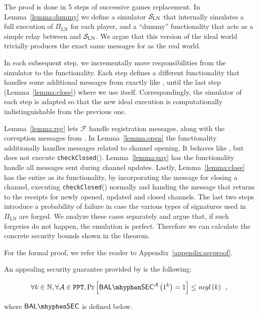   \begin{proofsketch}
    The proof is done in 5 steps of successive games replacement. In
    Lemma~\ref{lemma:dummy} we define a simulator $\mathcal{S}_{\mathrm{LN}}$
    that internally simulates a full execution of $\Pi_{\mathrm{LN}}$ for each
    player, and a ``dummy'' functionality that acts as a simple relay between
    \environment{} and $\mathcal{S}_{\mathrm{LN}}$. We argue that this version of
    the ideal world trivially produces the exact same messages for
    \environment{} as the real world.

    In each subsequent step, we incrementally move responsibilities from the
    simulator to the functionality. Each step defines a different functionality
    that handles some additional messages from \environment{} exactly like
    \fpaynet, until the last step (Lemma~\ref{lemma:close}) where we use
    \fpaynet{} itself. Correspondingly, the simulator of each step is adapted so
    that the new ideal execution is computationally indistinguishable from the
    previous one.

    Lemma~\ref{lemma:reg} lets $\mathcal{F}$ handle registration messages,
    along with the corruption messages from \simulator. In Lemma~\ref{lemma:open}
    the functionality additionally handles messages related to channel opening. It
    behaves like \fpaynet, but does not execute \texttt{checkClosed}().
    Lemma~\ref{lemma:pay} has the functionality handle all messages sent during
    channel updates. Lastly, Lemma~\ref{lemma:close} has the entire \fpaynet{} as
    its functionality, by incorporating the message for closing a channel,
    executing \texttt{checkClosed}() normally and handing the message that returns
    to \environment{} the receipts for newly opened, updated and closed
    channels. The last two steps introduce a probability of failure in case
    the various types of signatures used in  $\Pi_{\mathrm{LN}}$ are forged. We analyze these cases separately and argue that, if
    such forgeries do not happen, the emulation is perfect. Therefore we can
    calculate the concrete security bounds shown in the theorem.
  \end{proofsketch}
  For the formal proof, we refer the reader to Appendix~\ref{appendix:secproof}.

  An appealing security guarantee provided by \fpaynet{} is the following:
  \begin{corollary}
    \begin{equation*}
      \forall k \in \mathbb{N}, \forall \adversary{} \in \mathtt{PPT},
      \Pr\left[\mathsf{BAL \mhyphen SEC}^{\adversary}\left(1^k\right) = 1\right]
      \leq \mathit{negl}\left(k\right) \enspace,
    \end{equation*}
  \end{corollary}
  where $\mathsf{BAL \mhyphen SEC}$ is defined below. %

